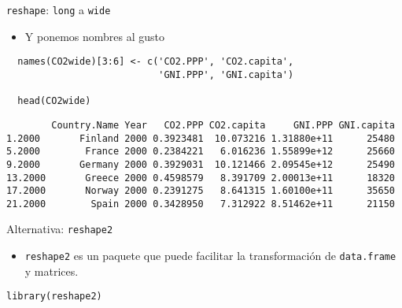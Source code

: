 \documentclass[xcolor={usenames,svgnames,dvipsnames}]{beamer}
\begin{document}
\begin{frame}[fragile,label=sec-4-7]{\texttt{reshape}: \texttt{long} a \texttt{wide}}
 \begin{itemize}
\item Y ponemos nombres al gusto
\end{itemize}
\lstset{language=R,label= ,caption= ,numbers=none}
\begin{lstlisting}
  names(CO2wide)[3:6] <- c('CO2.PPP', 'CO2.capita',
                           'GNI.PPP', 'GNI.capita')
  
  head(CO2wide)
\end{lstlisting}

\begin{verbatim}
        Country.Name Year   CO2.PPP CO2.capita     GNI.PPP GNI.capita
1.2000       Finland 2000 0.3923481  10.073216 1.31880e+11      25480
5.2000        France 2000 0.2384221   6.016236 1.55899e+12      25660
9.2000       Germany 2000 0.3929031  10.121466 2.09545e+12      25490
13.2000       Greece 2000 0.4598579   8.391709 2.00013e+11      18320
17.2000       Norway 2000 0.2391275   8.641315 1.60100e+11      35650
21.2000        Spain 2000 0.3428950   7.312922 8.51462e+11      21150
\end{verbatim}
\end{frame}

\begin{frame}[fragile,label=sec-4-8]{Alternativa: \texttt{reshape2}}
 \begin{itemize}
\item \texttt{reshape2} es un paquete que puede facilitar la transformación de \texttt{data.frame} y matrices.
\end{itemize}
\lstset{language=R,label= ,caption= ,numbers=none}
\begin{lstlisting}
library(reshape2)
\end{lstlisting}
\end{frame}
\end{document}
